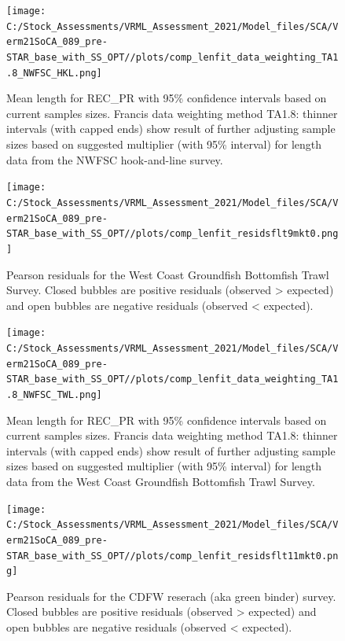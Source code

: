 \documentclass[
  english,
  a4paper,
]{article}
\begin{document}
\begin{figure}
\centering
\texttt{[image: C:/Stock\_Assessments/VRML\_Assessment\_2021/Model\_files/SCA/Verm21SoCA\_089\_pre-STAR\_base\_with\_SS\_OPT//plots/comp\_lenfit\_data\_weighting\_TA1.8\_NWFSC\_HKL.png]}
\caption{Mean length for REC\_PR with 95\% confidence intervals based on current samples sizes. Francis data weighting method TA1.8: thinner intervals (with capped ends) show result of further adjusting sample sizes based on suggested multiplier (with 95\% interval) for length data from the NWFSC hook-and-line survey.\label{fig:mean-len-fit-NWFSC_HKL}}
\end{figure}

\begin{figure}
\centering
\texttt{[image: C:/Stock\_Assessments/VRML\_Assessment\_2021/Model\_files/SCA/Verm21SoCA\_089\_pre-STAR\_base\_with\_SS\_OPT//plots/comp\_lenfit\_residsflt9mkt0.png]}
\caption{Pearson residuals for the West Coast Groundfish Bottomfish Trawl Survey. Closed bubbles are positive residuals (observed \textgreater{} expected) and open bubbles are negative residuals (observed \textless{} expected).\label{fig:len-pearson-NWFSC_TWL}}
\end{figure}

\begin{figure}
\centering
\texttt{[image: C:/Stock\_Assessments/VRML\_Assessment\_2021/Model\_files/SCA/Verm21SoCA\_089\_pre-STAR\_base\_with\_SS\_OPT//plots/comp\_lenfit\_data\_weighting\_TA1.8\_NWFSC\_TWL.png]}
\caption{Mean length for REC\_PR with 95\% confidence intervals based on current samples sizes. Francis data weighting method TA1.8: thinner intervals (with capped ends) show result of further adjusting sample sizes based on suggested multiplier (with 95\% interval) for length data from the West Coast Groundfish Bottomfish Trawl Survey.\label{fig:mean-len-fit-NWFSC_TWL}}
\end{figure}

\begin{figure}
\centering
\texttt{[image: C:/Stock\_Assessments/VRML\_Assessment\_2021/Model\_files/SCA/Verm21SoCA\_089\_pre-STAR\_base\_with\_SS\_OPT//plots/comp\_lenfit\_residsflt11mkt0.png]}
\caption{Pearson residuals for the CDFW reserach (aka green binder) survey. Closed bubbles are positive residuals (observed \textgreater{} expected) and open bubbles are negative residuals (observed \textless{} expected).\label{fig:len-pearson-CDFW_RESEARCH}}
\end{figure}
\end{document}
